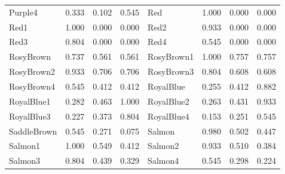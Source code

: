 {\begin{center}
\begin{tabular}{|l|l|l|l|l|l|l|l|}
Purple4             & 0.333 & 0.102 & 0.545 & Red                 & 1.000 & 0.000 & 0.000 \\ 
Red1                & 1.000 & 0.000 & 0.000 & Red2                & 0.933 & 0.000 & 0.000 \\ 
Red3                & 0.804 & 0.000 & 0.000 & Red4                & 0.545 & 0.000 & 0.000 \\ 
RosyBrown           & 0.737 & 0.561 & 0.561 & RosyBrown1          & 1.000 & 0.757 & 0.757 \\ 
RosyBrown2          & 0.933 & 0.706 & 0.706 & RosyBrown3          & 0.804 & 0.608 & 0.608 \\ 
RosyBrown4          & 0.545 & 0.412 & 0.412 & RoyalBlue           & 0.255 & 0.412 & 0.882 \\ 
RoyalBlue1          & 0.282 & 0.463 & 1.000 & RoyalBlue2          & 0.263 & 0.431 & 0.933 \\ 
RoyalBlue3          & 0.227 & 0.373 & 0.804 & RoyalBlue4          & 0.153 & 0.251 & 0.545 \\ 
SaddleBrown         & 0.545 & 0.271 & 0.075 & Salmon              & 0.980 & 0.502 & 0.447 \\ 
Salmon1             & 1.000 & 0.549 & 0.412 & Salmon2             & 0.933 & 0.510 & 0.384 \\ 
Salmon3             & 0.804 & 0.439 & 0.329 & Salmon4             & 0.545 & 0.298 & 0.224 \\ 
\hline
\end{tabular}
\end{center}

}
